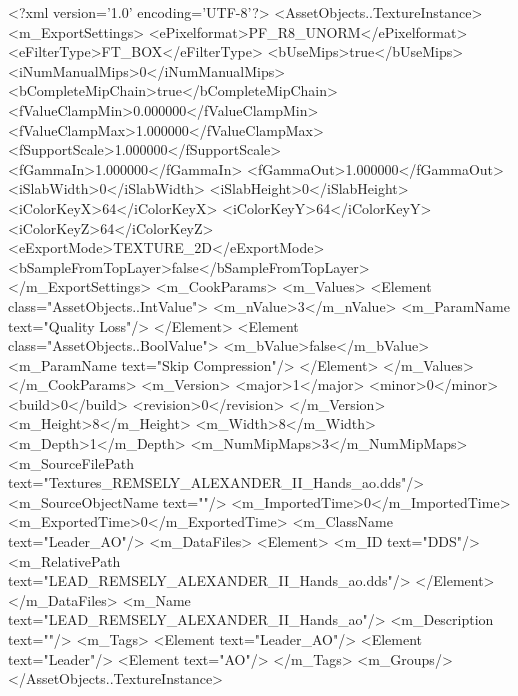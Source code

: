 <?xml version='1.0' encoding='UTF-8'?>
<AssetObjects..TextureInstance>
  <m_ExportSettings>
    <ePixelformat>PF_R8_UNORM</ePixelformat>
    <eFilterType>FT_BOX</eFilterType>
    <bUseMips>true</bUseMips>
    <iNumManualMips>0</iNumManualMips>
    <bCompleteMipChain>true</bCompleteMipChain>
    <fValueClampMin>0.000000</fValueClampMin>
    <fValueClampMax>1.000000</fValueClampMax>
    <fSupportScale>1.000000</fSupportScale>
    <fGammaIn>1.000000</fGammaIn>
    <fGammaOut>1.000000</fGammaOut>
    <iSlabWidth>0</iSlabWidth>
    <iSlabHeight>0</iSlabHeight>
    <iColorKeyX>64</iColorKeyX>
    <iColorKeyY>64</iColorKeyY>
    <iColorKeyZ>64</iColorKeyZ>
    <eExportMode>TEXTURE_2D</eExportMode>
    <bSampleFromTopLayer>false</bSampleFromTopLayer>
  </m_ExportSettings>
  <m_CookParams>
    <m_Values>
      <Element class="AssetObjects..IntValue">
        <m_nValue>3</m_nValue>
        <m_ParamName text="Quality Loss"/>
      </Element>
      <Element class="AssetObjects..BoolValue">
        <m_bValue>false</m_bValue>
        <m_ParamName text="Skip Compression"/>
      </Element>
    </m_Values>
  </m_CookParams>
  <m_Version>
    <major>1</major>
    <minor>0</minor>
    <build>0</build>
    <revision>0</revision>
  </m_Version>
  <m_Height>8</m_Height>
  <m_Width>8</m_Width>
  <m_Depth>1</m_Depth>
  <m_NumMipMaps>3</m_NumMipMaps>
  <m_SourceFilePath text="Textures\LEAD_REMSELY_ALEXANDER_II_Hands_ao.dds"/>
  <m_SourceObjectName text=""/>
  <m_ImportedTime>0</m_ImportedTime>
  <m_ExportedTime>0</m_ExportedTime>
  <m_ClassName text="Leader_AO"/>
  <m_DataFiles>
    <Element>
      <m_ID text="DDS"/>
      <m_RelativePath text="LEAD_REMSELY_ALEXANDER_II_Hands_ao.dds"/>
    </Element>
  </m_DataFiles>
  <m_Name text="LEAD_REMSELY_ALEXANDER_II_Hands_ao"/>
  <m_Description text=""/>
  <m_Tags>
    <Element text="Leader_AO"/>
    <Element text="Leader"/>
    <Element text="AO"/>
  </m_Tags>
  <m_Groups/>
</AssetObjects..TextureInstance>
